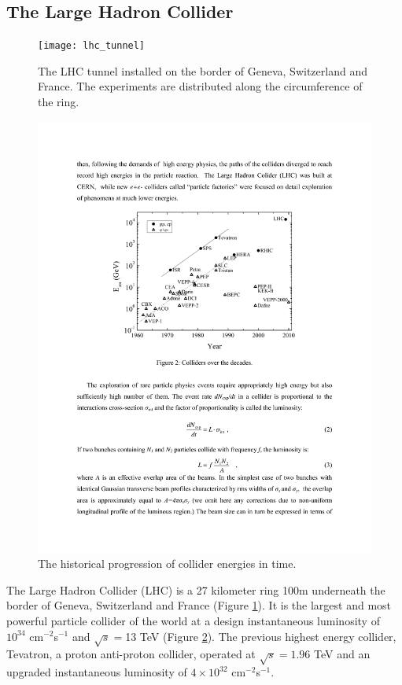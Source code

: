 \subsection{The Large Hadron Collider}

\begin{figure}
\begin{center}
\texttt{[image: lhc\_tunnel]}
\caption{The LHC tunnel installed on the border of Geneva, Switzerland and France. 
The experiments are distributed along the circumference of the ring. \label{fig:tunnels}}
\end{center}
\end{figure}

\begin{figure}
\begin{center}
\includegraphics[width=.75\textwidth]{pics/collider_energies}
\caption{The historical progression of collider energies in time.\label{fig:colliders}}
\end{center}
\end{figure}



The Large Hadron Collider (LHC) is a 27 kilometer ring 100m underneath the border of Geneva, Switzerland and France 
(Figure \ref{fig:tunnels}). It is the largest and most powerful particle collider of the world at a design
instantaneous luminosity of $10^{34}$ cm$^{-2}$s$^{-1}$ and $\sqrt{s}=$13 TeV (Figure \ref{fig:colliders}). 
The previous highest energy collider, Tevatron, a proton anti-proton collider, operated at $\sqrt{s}=1.96$ TeV 
and an upgraded instantaneous luminosity of $4\times 10^{32}$ cm$^{-2}$s$^{-1}$. 

